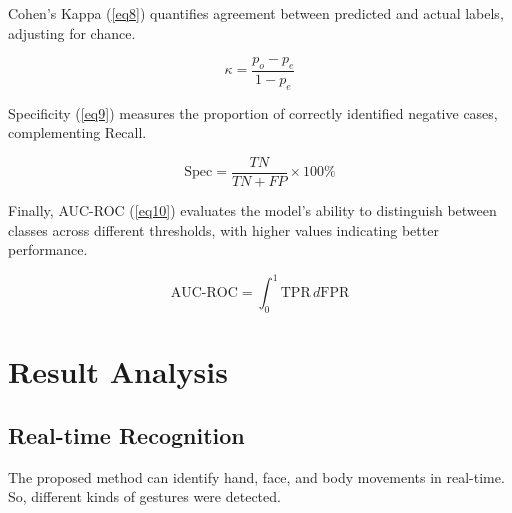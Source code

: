 \documentclass[preprint,12pt,authoryear]{elsarticle}
\begin{document}
Cohen’s Kappa (\ref{eq8}) quantifies agreement between predicted and actual labels, adjusting for chance.  

\begin{equation}
\kappa = \frac{p_o - p_e}{1 - p_e}
\label{eq8}
\end{equation}

Specificity (\ref{eq9}) measures the proportion of correctly identified negative cases, complementing Recall.  

\begin{equation}
\text{Spec} = \frac{TN}{TN + FP} \times 100\%
\label{eq9}
\end{equation}

Finally, AUC-ROC (\ref{eq10}) evaluates the model’s ability to distinguish between classes across different thresholds, with higher values indicating better performance.  

\begin{equation}
\text{AUC-ROC} = \int_0^1 \text{TPR} \, d\text{FPR}
\label{eq10}
\end{equation}




\section{Result Analysis}
\label{sec:results}

\subsection{Real-time Recognition}
The proposed method can identify hand, face, and body movements in real-time. So, different kinds of gestures were detected.
\end{document}
